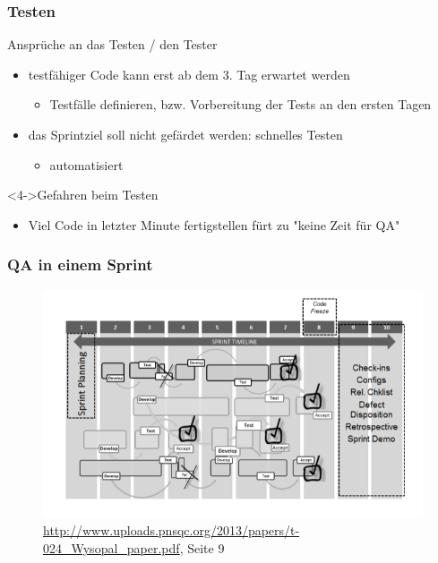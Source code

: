 \documentclass{beamer}
\begin{document}
\begin{frame}
\frametitle{Testen}
\begin{block}{Ansprüche an das Testen / den Tester}
	\begin{itemize}
		\item<2-> testfähiger Code kann erst ab dem 3. Tag erwartet werden
		\begin{itemize}
			\item Testfälle definieren, bzw. Vorbereitung der Tests an den ersten Tagen
		\end{itemize}
		\item<3-> das Sprintziel soll nicht gefärdet werden: schnelles Testen
		\begin{itemize}
			\item automatisiert
		\end{itemize}
	\end{itemize}
\end{block}
\begin{block}<4->{Gefahren beim Testen}
	\begin{itemize}
		\item<5-> Viel Code in letzter Minute fertigstellen fürt zu "keine Zeit für QA"
	\end{itemize}
\end{block}
\end{frame}

\begin{frame}
\frametitle{QA in einem Sprint}
\begin{figure}
	\includegraphics[scale=0.6]{./presGraphics/sprintQA}
	\caption{\url{http://www.uploads.pnsqc.org/2013/papers/t-024_Wysopal_paper.pdf}, Seite 9}
\end{figure}
\end{frame}
\end{document}
